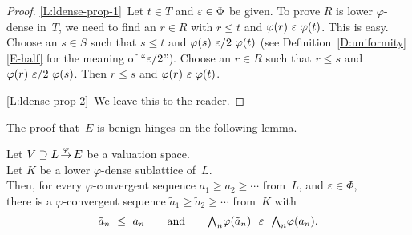\documentclass[main.tex]{subfiles}
\begin{document}
\begin{proof}
\noindent\ref{L:ldense-prop-1}\ 
Let $t\in T$ and $\varepsilon \in\Phi$ be given.
To prove $R$ is lower $\varphi$-dense in~$T$,
we need to find an $r\in R$
with $r\leq t$ and $\varphi(r) \ \varepsilon\ \varphi(t)$.
This is easy.
Choose an $s\in S$
such that $s \leq t$ and $\varphi(s)\ \varepsilon/2\ \varphi(t)$
(see Definition~\ref{D:uniformity}\ref{E-half}
for the meaning of ``$\varepsilon/2$'').
Choose an $r\in R$
such that $r\leq s$ and $\varphi(r)\ \varepsilon/2\ \varphi(s)$.
Then $r\leq s$ and $\varphi(r) \ \varepsilon\ \varphi(t)$.
\vspace{.3em}

\noindent\ref{L:ldense-prop-2}\ 
We leave this to the reader.
\end{proof}
%
%
%
%
The proof that~$E$
 is benign
hinges on the following lemma.
\begin{lem}
\label{lem:main}
Let $V \supseteq L\,\smash{\stackrel{\varphi}{\rightarrow}}\,E$ be a valuation space.\\
Let $K$ be a lower $\varphi$-dense sublattice of~$L$.\\
Then, for every $\varphi$-convergent sequence
 $a_1 \geq a_2 \geq \dotsb$ from~$L$,
and $\varepsilon\in \Phi$,\\
there is a $\varphi$-convergent sequence
$\tilde a_1 \geq \tilde a_2 \geq \dotsb$ from~$K$
with 
\begin{equation}
\label{eq:main}
\tilde a_n \ \leq\  a_n
\qquad\text{and}\qquad
\textstyle{\bigwedge}_n \varphi (\tilde a_n) \ \ \varepsilon\ \ \textstyle{\bigwedge}_n\varphi (a_n).
\end{equation}
\end{lem}
\end{document}
